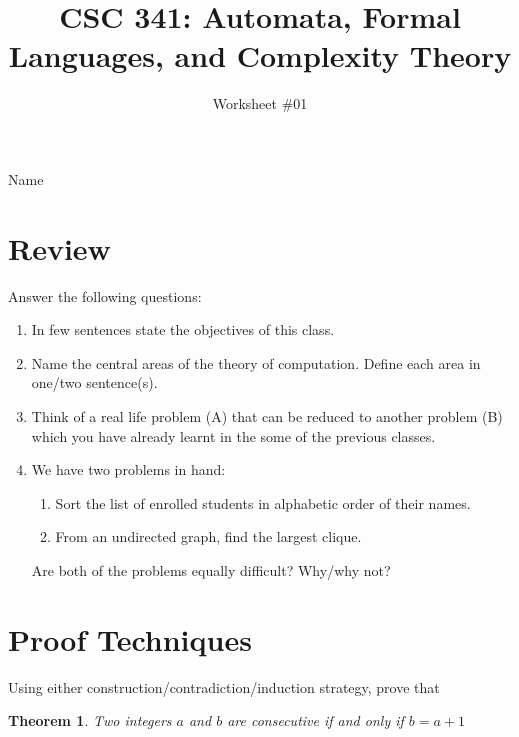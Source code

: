 \documentclass[11pt, oneside]{article}   	%
\title{CSC 341: Automata, Formal Languages, and Complexity Theory}
\author{Worksheet \#01}
\date{}							%
\newtheorem*{theorem*}{Theorem}
\begin{document}
\maketitle
Name \underline{\hspace{10cm}}
\\
\section{Review}
\par Answer the following questions:
\begin{enumerate}
\item In few sentences state the objectives of this class.
\item Name the central areas of the theory of computation. Define each area in one/two sentence(s).
\item Think of a real life problem (A) that can be reduced to another problem (B) which you have already learnt in the some of the previous classes.
\item We have two problems in hand:
 \begin{enumerate}
 \item Sort the list of enrolled students in alphabetic order of their names.
 \item From an undirected graph, find the largest clique.
\end{enumerate}
Are both of the problems equally difficult? Why/why not?
\end{enumerate}
\newpage
\section{Proof Techniques}
Using either construction/contradiction/induction strategy, prove that

\begin{theorem*}
Two integers $a$ and $b$ are consecutive if and only if $b = a + 1$ 
\end{theorem*}
\end{document}
